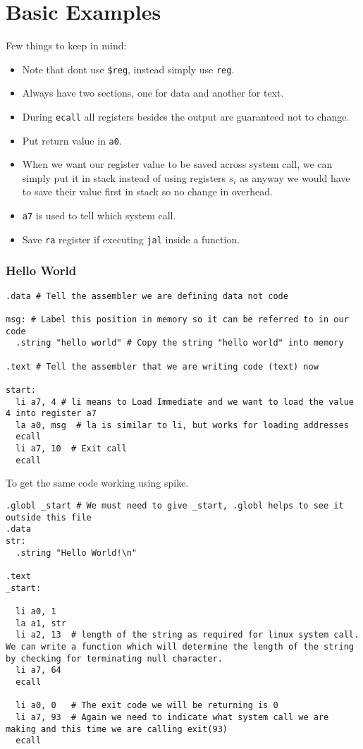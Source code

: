 \section{Basic Examples}

Few things to keep in mind:

\begin{itemize}
  \item Note that dont use \texttt{\$reg}, instead simply use \texttt{reg}.
  \item Always have two sections, one for data and another for text.
  \item During \texttt{ecall} all registers besides the output are guaranteed not to change.
  \item Put return value in \texttt{a0}.
  \item When we want our register value to be saved across system call, we can simply put it in stack instead of using registers $s_i$ as anyway we would have to save their value first in stack so no change in overhead.
  \item \texttt{a7} is used to tell which system call.
  \item Save \texttt{ra} register if executing \texttt{jal} inside a function.
\end{itemize}

\subsubsection{Hello World}

\begin{verbatim}
.data # Tell the assembler we are defining data not code

msg: # Label this position in memory so it can be referred to in our code
  .string "hello world" # Copy the string "hello world" into memory 

.text # Tell the assembler that we are writing code (text) now 

start:
  li a7, 4 # li means to Load Immediate and we want to load the value 4 into register a7
  la a0, msg  # la is similar to li, but works for loading addresses
  ecall
  li a7, 10  # Exit call
  ecall
\end{verbatim}

To get the same code working using spike. 

\begin{verbatim}
.globl _start # We must need to give _start, .globl helps to see it outside this file
.data 
str:   
  .string "Hello World!\n" 

.text 
_start: 

  li a0, 1   
  la a1, str 
  li a2, 13  # length of the string as required for linux system call. We can write a function which will determine the length of the string by checking for terminating null character.
  li a7, 64  
  ecall 

  li a0, 0   # The exit code we will be returning is 0
  li a7, 93  # Again we need to indicate what system call we are making and this time we are calling exit(93)
  ecall 
\end{verbatim}

